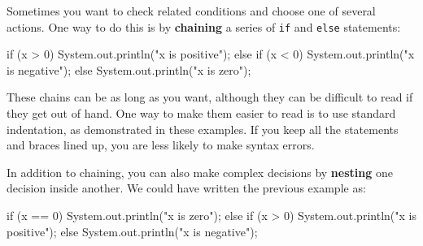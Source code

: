 \documentclass[12pt]{book}
\theoremstyle{exercise}
\newcommand{\java}[1]{\lstinline{#1}} %
\begin{document}
%
%
%
%
%
%


Sometimes you want to check related conditions and choose one of several actions.
One way to do this is by {\bf chaining} a series of \java{if} and \java{else} statements:

\begin{code}
    if (x > 0) {
        System.out.println("x is positive");
    } else if (x < 0) {
        System.out.println("x is negative");
    } else {
        System.out.println("x is zero");
    }
\end{code}

These chains can be as long as you want, although they can be difficult to read if they get out of hand.
One way to make them easier to read is to use standard indentation, as demonstrated in these examples.
If you keep all the statements and braces lined up, you are less likely to make syntax errors.


In addition to chaining, you can also make complex decisions by {\bf nesting} one decision inside another.
We could have written the previous example as:

\begin{code}
    if (x == 0) {
        System.out.println("x is zero");
    } else {
        if (x > 0) {
            System.out.println("x is positive");
        } else {
            System.out.println("x is negative");
        }
    }
\end{code}
\end{document}
